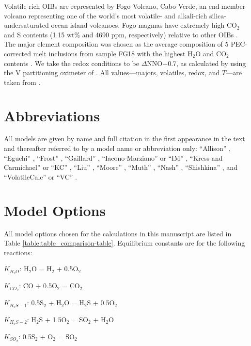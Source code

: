 \documentclass[draft, english]{volcanica-template}
\begin{document}
Volatile-rich OIBs are represented by Fogo Volcano, Cabo Verde, an end-member volcano representing one of the world's most volatile- and alkali-rich silica-undersaturated ocean island volcanoes. Fogo magmas have extremely high CO$_2$ and S contents (1.15 wt\% and 4690 ppm, respectively) relative to other OIBs \parencite{devitre2023oceanic}. The major element composition was chosen as the average composition of 5 PEC-corrected melt inclusions from sample FG18 with the highest H$_2$O and CO$_2$ contents \parencite{devitre2023oceanic}. We take the redox conditions to be $\Delta$NNO+0.7, as calculated by \textcite{devitre2023oceanic} using the V partitioning oximeter of \textcite{canil2002vanadium}. All values—majors, volatiles, redox, and $T$—are taken from \textcite{devitre2023oceanic}.

\section{Abbreviations}

All models are given by name and full citation in the first appearance in the text and thereafter referred to by a model name or abbreviation only: ``Allison'' \parencite{Allison2019}, ``Eguchi'' \parencite{Eguchi2018}, ``Frost'' \parencite{Frost1991}, ``Gaillard'' \parencite{Gaillard2003}, ``Iacono-Marziano'' or ``IM'' \parencite{IaconoMarziano2012}, ``Kress and Carmichael'' or ``KC'' \parencite{Kress1991}, ``Liu'' \parencite{Liu2005}, ``Moore'' \parencite{Moore1998}, ``Muth'' \parencite{Muth2021}, ``Nash'' \parencite{Nash2019}, ``Shishkina'' \parencite{Shishkina2014}, and ``VolatileCalc'' or ``VC'' \parencite[referring to both the original model equations and the Excel VisualBasic app:][]{dixon1995, Newman2002}.

\section{Model Options}
All model options chosen for the calculations in this manuscript are listed in Table \ref{table:table_comparison-table}. Equilibrium constants are for the following reactions:

$K_{H_2O}$: H$_2$O = H$_2$ + 0.5O$_2$

$K_{CO_2}$: CO + 0.5O$_2$ = CO$_2$

$K_{H_2S-1}$: 0.5S$_2$ + H$_2$O = H$_2$S + 0.5O$_2$

$K_{H_2S-2}$: H$_2$S + 1.5O$_2$ = SO$_2$ + H$_2$O

$K_{SO_2}$: 0.5S$_2$ + O$_2$ = SO$_2$
\end{document}
